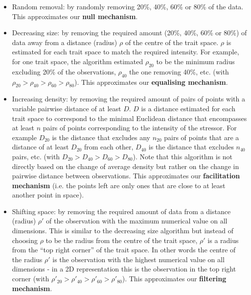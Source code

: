 \documentclass[12pt,letterpaper]{article}
\begin{document}
\begin{itemize}
\item Random removal: by randomly removing 20\%, 40\%, 60\% or 80\% of the data.
This approximates our \textbf{null mechanism}.

\item Decreasing size: by removing the required amount (20\%, 40\%, 60\% or 80\%) of data away from a distance (radius) $\rho$ of the centre of the trait space.
$\rho$ is estimated for each trait space to match the required intensity. For example, for one trait space, the algorithm estimated $\rho_{20}$ to be the minimum radius excluding 20\% of the observations, $\rho_{40}$ the one removing 40\%, etc. (with $\rho_{20} > \rho_{40} > \rho_{60} > \rho_{80}$).
This approximates our \textbf{equalising mechanism}.

\item Increasing density: by removing the required amount of pairs of points with a variable pairwise distance of at least $D$.
$D$ is a distance estimated for each trait space to correspond to the minimal Euclidean distance that encompasses at least $n$ pairs of points corresponding to the intensity of the stressor.
For example $D_{20}$ is the distance that excludes any $n_{20}$ pairs of points that are a distance of at least $D_{20}$ from each other, $D_{40}$ is the distance that excludes $n_{40}$ pairs, etc. (with $D_{20} > D_{40} > D_{60} > D_{80}$).
Note that this algorithm is not directly based on the change of average density but rather on the change in pairwise distance between observations.
This approximates our \textbf{facilitation mechanism} (i.e. the points left are only ones that are close to at least another point in space).

\item Shifting space: by removing the required amount of data from a distance (radius) $\rho'$ of the observation with the maximum numerical value on all dimensions.
This is similar to the decreasing size algorithm but instead of choosing $\rho$ to be the radius from the centre of the trait space, $\rho'$ is a radius from the ``top right corner'' of the trait space.
In other words the centre of the radius $\rho'$ is the observation with the highest numerical value on all dimensions - in a 2D representation this is the observation in the top right corner (with $\rho'_{20} > \rho'_{40} > \rho'_{60} > \rho'_{80}$).
This approximates our \textbf{filtering mechanism}.


\end{itemize}
\end{document}
